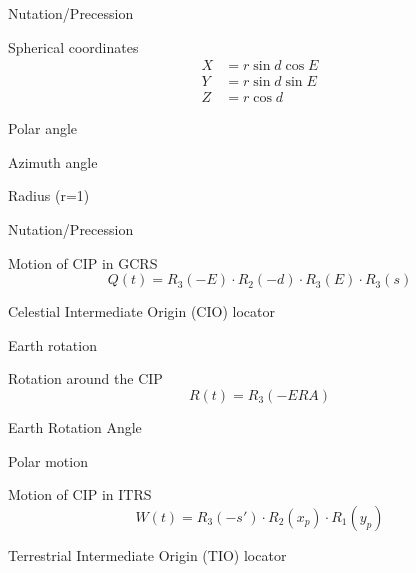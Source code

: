 \documentclass[14pt,table,t, c]{beamer}
\begin{document}
\begin{frame}{Nutation/Precession}
\begin{block}{Spherical coordinates}
\vspace*{-\baselineskip}\setlength\belowdisplayskip{0pt}\setlength\abovedisplayskip{0pt}
\begin{align*}
X &= r \sin d \cos E \\
Y &= r \sin d \sin E \\
Z &= r \cos d
\end{align*}
\end{block}
\begin{description}[$d$]
\item[$d$] Polar angle
\item[$E$] Azimuth angle
\item[$r$] Radius (r=1)
\end{description}
\end{frame}

\begin{frame}{Nutation/Precession}
\begin{block}{Motion of CIP in GCRS}
\vspace*{-\baselineskip}\setlength\belowdisplayskip{0pt}\setlength\abovedisplayskip{0pt}
\begin{equation*}
Q(t) = R_3(-E) \cdot R_2(-d) \cdot R_3(E) \cdot R_3(s)
\end{equation*}
\end{block}
\begin{description}[$s$]
\item[$s$] Celestial Intermediate Origin (CIO) locator
\end{description}
\end{frame}

\begin{frame}{Earth rotation}
\begin{block}{Rotation around the CIP}
\vspace*{-\baselineskip}\setlength\belowdisplayskip{0pt}\setlength\abovedisplayskip{0pt}
\begin{equation*}
R(t) = R_3(-ERA)
\end{equation*}
\end{block}
\begin{description}[$ERA$]
\item[$ERA$] Earth Rotation Angle
\end{description}
\end{frame}

\begin{frame}{Polar motion}
\begin{block}{Motion of CIP in ITRS}
\vspace*{-\baselineskip}\setlength\belowdisplayskip{0pt}\setlength\abovedisplayskip{0pt}
\begin{equation*}
W(t) = R_3(-s') \cdot R_2(x_p) \cdot R_1(y_p) 
\end{equation*}
\end{block}
\begin{description}[$s'$]
\item[$s'$] Terrestrial Intermediate Origin (TIO) locator
\end{description}
\end{frame}
\end{document}
